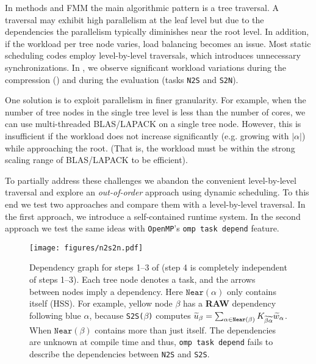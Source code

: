 In \hmatrix{} methods and FMM the main algorithmic pattern is a tree traversal. A traversal may exhibit high parallelism at the leaf level but due to the dependencies the parallelism typically diminishes near  the root level. In addition, if the workload per tree node varies, load balancing becomes an issue.  Most static scheduling codes employ level-by-level traversals, which introduces unnecessary synchronizations. In \gofmm{}, we observe significant workload variations during the compression () and during the evaluation (tasks \texttt{N2S} and \texttt{S2N}). 

One solution is to exploit parallelism in finer granularity. For example, when the number of tree nodes
in the single tree level is less than the number of cores, we can use
multi-threaded BLAS/LAPACK on a single tree node. However, this is insufficient
if the workload does not increase significantly (e.g. growing with
$\lvert\alpha\rvert$)
while approaching the root. %
(That is, the workload must be within the strong scaling range of BLAS/LAPACK to
be efficient).

To partially address these challenges we abandon the convenient level-by-level
traversal and explore an \emph{out-of-order} approach using dynamic scheduling.
To this end we test two approaches and compare them with a level-by-level
traversal. In the first approach, we introduce a self-contained runtime system.
In the second approach we test the same ideas with \texttt{OpenMP}'s \texttt{omp task depend} feature. 

\begin{figure}[!t]
  \centering
  \texttt{[image: figures/n2s2n.pdf]}
  \caption{Dependency graph for steps 1--3 of  (step 4 is completely independent of steps 1--3).
    Each tree node denotes a task, and the arrows between nodes imply a
    dependency. Here $\mathtt{Near}(\alpha)$ only contains itself (HSS). For example, yellow node $\beta$ has a \textbf{RAW}
    dependency following blue $\alpha$, because \texttt{S2S($\beta$)} computes 
  ${\widetilde{u}}_{\beta} = \sum_{\alpha \in
  \mathtt{Near}(\beta)}K_{{\widetilde{\beta}}{\widetilde{\alpha}}}{\widetilde{w}}_{\alpha}$.
  When $\mathtt{Near}(\beta)$ contains more than just itself. The dependencies
    are unknown at compile time and thus, \texttt{omp task depend} fails to describe 
    the dependencies between \texttt{N2S} and \texttt{S2S}.
  }
  \label{fig:n2s2n}
\end{figure}


